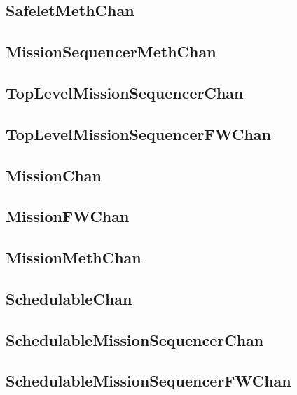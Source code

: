 \documentclass{article}
\begin{document}
\begin{plumbing}
\subsection{SafeletMethChan}


\subsection{MissionSequencerMethChan}


\subsection{TopLevelMissionSequencerChan}


\subsection{TopLevelMissionSequencerFWChan}


\subsection{MissionChan}


\subsection{MissionFWChan}


\subsection{MissionMethChan}


\subsection{SchedulableChan}


\subsection{SchedulableMissionSequencerChan}


\subsection{SchedulableMissionSequencerFWChan}



\end{plumbing}
\end{document}
